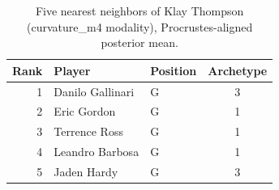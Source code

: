 \begin{table}[htbp]
  \centering\small
  \begin{tabular}{rllc}
    \toprule
    Rank & Player & Position & Archetype \\
    \midrule
    1 & Danilo Gallinari & G & 3 \\
    2 & Eric Gordon & G & 1 \\
    3 & Terrence Ross & G & 1 \\
    4 & Leandro Barbosa & G & 1 \\
    5 & Jaden Hardy & G & 3 \\
    \bottomrule
  \end{tabular}
  \caption{Five nearest neighbors of Klay Thompson (curvature_m4 modality), Procrustes-aligned posterior mean.}
  \label{tab:Klay_Thompson_neighbors_curvature_m4}
\end{table}

